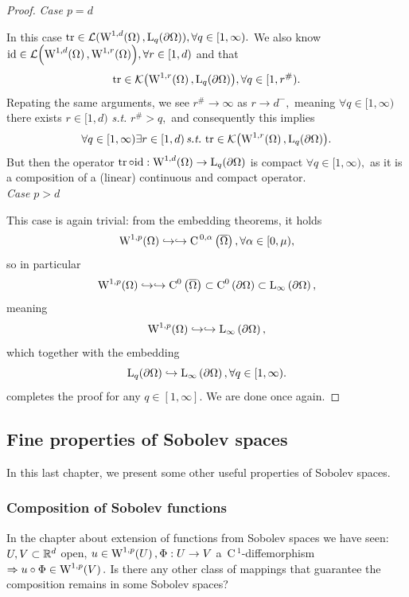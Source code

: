 \documentclass{article}
\begin{document}
\begin{proof}
\textit{Case $p = d$}

In this case $\trace \in \mathcal{L}(\WkpSet[1][d]{\Omega}, \LpSet[q]{\partial \Omega}), \forall q \in [1,\infty).$ We also know $\idop \in \mathcal{L}\qty(\WkpSet[1][d]{\Omega}, \WkpSet[1][r]{\Omega}), \forall r \in [1,d)$ and that
\[
	\trace \in \mathcal{K}\qty(\WkpSet[1][r]{\Omega}, \LpSet[q]{\partial \Omega}), \forall q \in [1, r^{\#}).
\]
Repating the same arguments, we see $r^{\#} \to \infty$ as $r \to d^-,$ meaning $\forall q \in [1,\infty)$ there exists $r \in [1,d)$ \textit{s.t.} $r^{\#} > q,$ and consequently this implies
\[
	\forall q \in [1, \infty) \exists r \in [1,d) \, \text{\textit{s.t.}} \, \trace \in \mathcal{K}\qty(\WkpSet[1][r]{\Omega}, \LpSet[q]{\partial \Omega}).
\]
But then the operator $\trace \circ \idop: \WkpSet[1][d]{\Omega} \to \LpSet[q]{\partial \Omega}$ is compact $\forall q \in [1, \infty),$ as it is a composition of a (linear) continuous and compact operator. \\

\textit{Case $p > d$}

This case is again trivial: from the embedding theorems, it holds
\[
	\WkpSet[1][p]{\Omega} \hookrightarrow \hookrightarrow \CklSet{0}{\alpha}{\overline{\Omega}}, \forall \alpha \in [0,\mu),
\]
so in particular
\[
	\WkpSet[1][p]{\Omega} \hookrightarrow \hookrightarrow \CkSet{0}{\overline{\Omega}} \subset \CkSet{0}{\partial \Omega} \subset \LinfSet{\partial \Omega},
\]
meaning
\[
	\WkpSet[1][p]{\Omega} \hookrightarrow \hookrightarrow \LinfSet{\partial \Omega},
\]
which together with the embedding
\[
	\LpSet[q]{\partial \Omega} \hookrightarrow \LinfSet{\partial \Omega}, \forall q \in [1, \infty).
\]
completes the proof for any $q \in [1, \infty].$ We are done once again.

\end{proof}

\subsection{Fine properties of Sobolev spaces}
\label{sec:fine_properties}
In this last chapter, we present some other useful properties of Sobolev spaces.

\subsubsection{Composition of Sobolev functions}
\label{sec:composition}

In the chapter about extension of functions from Sobolev spaces we have seen: $U,V \subset {\mathbb R}^{d}$ open, $u \in \WkpSet[1][p]{U}, \Phi: U \to V$ a $\, \text{C} \,^1$-diffemorphism $\Rightarrow u \circ \Phi \in \WkpSet[1][p]{V}.$ Is there any other class of mappings that guarantee the composition remains in some Sobolev spaces?
\end{document}
